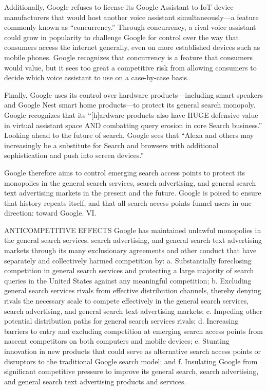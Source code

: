 \documentclass[11pt,b5paper]{scrartcl}
\begin{document}

Additionally, Google refuses to license its Google Assistant to IoT device
manufacturers that would host another voice assistant simultaneously—a feature commonly
known as “concurrency.” Through concurrency, a rival voice assistant could grow in popularity
to challenge Google for control over the way that consumers access the internet generally, even
on more established devices such as mobile phones. Google recognizes that concurrency is a
feature that consumers would value, but it sees too great a competitive risk from allowing
consumers to decide which voice assistant to use on a case-by-case basis.


Finally, Google uses its control over hardware products—including smart
speakers and Google Nest smart home products—to protect its general search monopoly. Google
recognizes that its “[h]ardware products also have HUGE defensive value in virtual assistant
space AND combatting query erosion in core Search business.” Looking ahead to the future of
search, Google sees that “Alexa and others may increasingly be a substitute for Search and
browsers with additional sophistication and push into screen devices.”


Google therefore aims to control emerging search access points to protect its
monopolies in the general search services, search advertising, and general search text advertising
markets in the present and the future. Google is poised to ensure that history repeats itself, and
that all search access points funnel users in one direction: toward Google.
VI.


ANTICOMPETITIVE EFFECTS
Google has maintained unlawful monopolies in the general search services, search
advertising, and general search text advertising markets through its many exclusionary
agreements and other conduct that have separately and collectively harmed competition by:
a.
Substantially foreclosing competition in general search services and
protecting a large majority of search queries in the United States against
any meaningful competition;
b.
Excluding general search services rivals from effective distribution
channels, thereby denying rivals the necessary scale to compete effectively
in the general search services, search advertising, and general search text
advertising markets;
c.
Impeding other potential distribution paths for general search services
rivals;
d.
Increasing barriers to entry and excluding competition at emerging search
access points from nascent competitors on both computers and mobile
devices;
e.
Stunting innovation in new products that could serve as alternative search
access points or disruptors to the traditional Google search model; and
f.
Insulating Google from significant competitive pressure to improve its
general search, search advertising, and general search text advertising
products and services.
\end{document}
